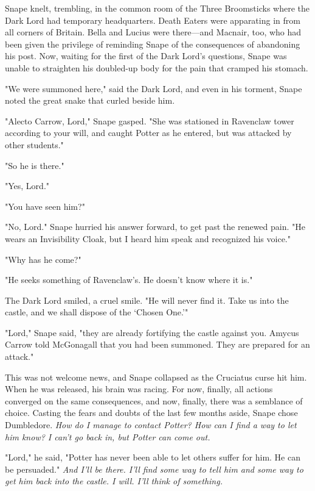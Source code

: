 \sbreak

Snape knelt, trembling, in the common room of the Three Broomsticks where the Dark Lord had temporary headquarters. Death Eaters were apparating in from all corners of Britain. Bella and Lucius were there—and Macnair, too, who had been given the privilege of reminding Snape of the consequences of abandoning his post. Now, waiting for the first of the Dark Lord's questions, Snape was unable to straighten his doubled-up body for the pain that cramped his stomach.

"We were summoned here," said the Dark Lord, and even in his torment, Snape noted the great snake that curled beside him.

"Alecto Carrow, Lord," Snape gasped. "She was stationed in Ravenclaw tower according to your will, and caught Potter as he entered, but was attacked by other students."

"So he is there."

"Yes, Lord."

"You have seen him?"

"No, Lord." Snape hurried his answer forward, to get past the renewed pain. "He wears an Invisibility Cloak, but I heard him speak and recognized his voice."

"Why has he come?"

"He seeks something of Ravenclaw's. He doesn't know where it is."

The Dark Lord smiled, a cruel smile. "He will never find it. Take us into the castle, and we shall dispose of the `Chosen One.'"

"Lord," Snape said, "they are already fortifying the castle against you. Amycus Carrow told McGonagall that you had been summoned. They are prepared for an attack."

This was not welcome news, and Snape collapsed as the Cruciatus curse hit him. When he was released, his brain was racing. For now, finally, all actions converged on the same consequences, and now, finally, there was a semblance of choice. Casting the fears and doubts of the last few months aside, Snape chose Dumbledore. \emph{How do I manage to contact Potter? How can I find a way to let him know? I can't go back in, but Potter can come out.}

"Lord," he said, "Potter has never been able to let others suffer for him. He can be persuaded." \emph{And I'll be there. I'll find some way to tell him and some way to get him back into the castle. I will. I'll think of something.}

